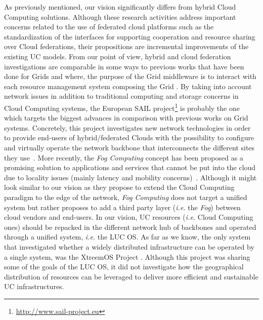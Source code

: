 As previously mentioned, our vision significantly differs from hybrid Cloud Computing
solutions.  Although these research activities address important concerns related to the
use of federated cloud platforms such as the standardization of the interfaces for
supporting cooperation and resource sharing over Cloud federations, their propositions are
incremental improvements of the existing UC models. From our point of view, hybrid and
cloud federation investigations are comparable in some ways to previous works that have
been done for Grids and where, the purpose of the Grid middleware is to interact with each
resource management system composing the Grid
\cite{buyya:2010,rochwerger:2009,zhao:2012}. By taking into account network issues in
addition to traditional computing and storage concerns in Cloud Computing systems, the
European SAIL
project\footnote{\href{http://www.sail-project.eu}{\url{http://www.sail-project.eu}}} is
probably the one which targets the biggest advances in comparison with previous works on
Grid systems. Concretely, this project investigates new network technologies in order to
provide end-users of hybrid/federated Clouds with the possibility to configure and
virtually operate the network backbone that interconnects the different sites they
use~\cite{sail:2012}.
%
More recently, the \emph{Fog Computing} concept has been proposed
as a promising solution to applications and services that
cannot be put into the cloud due to locality issues (mainly latency and
mobility concerns)~\cite{bonomi:2012}.  Although it might look similar to our vision as they
propose to extend the Cloud Computing paradigm to the edge of the network,
\emph{Fog Computing} does not target a unified system but rather proposes to
add a third party layer (\textit{i.e.} the \emph{Fog}) between cloud vendors and
end-users.
%
In our vision, UC resources (\textit{i.e.} Cloud Computing ones) should be repacked in
the different network hub of backbones and operated through a unified system, \textit{i.e.} the LUC OS.
%
As far as we know, the only system that investigated whether a
widely distributed infrastructure can be operated by a single system, was the
XtreemOS Project \cite{morin:2007}. Although this project was sharing some of
the goals of the LUC OS, it did not investigate how the geographical
distribution of resources can be leveraged to deliver more efficient and sustainable
UC infrastructures. 
%

